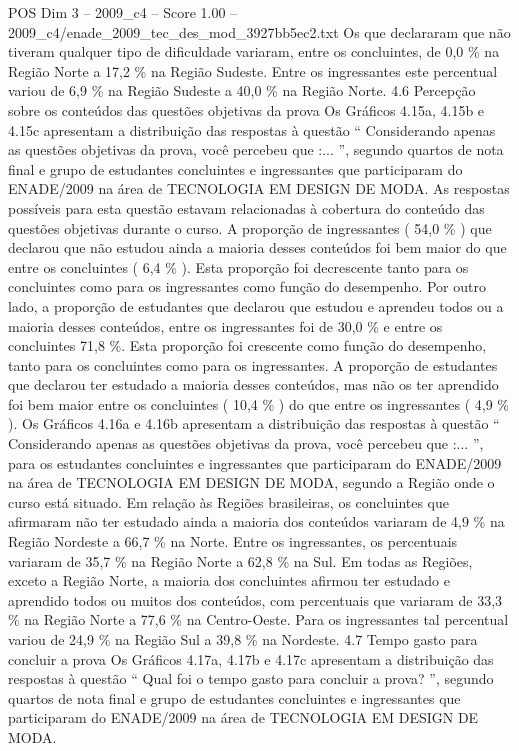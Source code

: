 \begin{textsample}{POS Dim 3 – 2009\_c4 – Score 1.00 – 2009\_c4/enade\_2009\_tec\_des\_mod\_3927bb5ec2.txt}
Os que declararam que não tiveram qualquer tipo de dificuldade variaram, entre os concluintes, de 0,0 \% na Região Norte a 17,2 \% na Região Sudeste.
Entre os ingressantes este percentual variou de 6,9 \% na Região Sudeste a 40,0 \% na Região Norte. 4.6 Percepção sobre os conteúdos das questões objetivas da prova Os Gráficos 4.15a, 4.15b e 4.15c apresentam a distribuição das respostas à questão “ Considerando apenas as questões objetivas da prova, você percebeu que :... ”, segundo quartos de nota final e grupo de estudantes concluintes e ingressantes que participaram do ENADE/2009 na área de TECNOLOGIA EM DESIGN DE MODA.
As respostas possíveis para esta questão estavam relacionadas à cobertura do conteúdo das questões objetivas durante o curso.
A proporção de ingressantes ( 54,0 \% ) que declarou que não estudou ainda a maioria desses conteúdos foi bem maior do que entre os concluintes ( 6,4 \% ).
Esta proporção foi decrescente tanto para os concluintes como para os ingressantes como função do desempenho.
Por outro lado, a proporção de estudantes que declarou que estudou e aprendeu todos ou a maioria desses conteúdos, entre os ingressantes foi de 30,0 \% e entre os concluintes 71,8 \%.
Esta proporção foi crescente como função do desempenho, tanto para os concluintes como para os ingressantes.
A proporção de estudantes que declarou ter estudado a maioria desses conteúdos, mas não os ter aprendido foi bem maior entre os concluintes ( 10,4 \% ) do que entre os ingressantes ( 4,9 \% ).
Os Gráficos 4.16a e 4.16b apresentam a distribuição das respostas à questão “ Considerando apenas as questões objetivas da prova, você percebeu que :... ”, para os estudantes concluintes e ingressantes que participaram do ENADE/2009 na área de TECNOLOGIA EM DESIGN DE MODA, segundo a Região onde o curso está situado.
Em relação às Regiões brasileiras, os concluintes que afirmaram não ter estudado ainda a maioria dos conteúdos variaram de 4,9 \% na Região Nordeste a 66,7 \% na Norte.
Entre os ingressantes, os percentuais variaram de 35,7 \% na Região Norte a 62,8 \% na Sul.
Em todas as Regiões, exceto a Região Norte, a maioria dos concluintes afirmou ter estudado e aprendido todos ou muitos dos conteúdos, com percentuais que variaram de 33,3 \% na Região Norte a 77,6 \% na Centro-Oeste.
Para os ingressantes tal percentual variou de 24,9 \% na Região Sul a 39,8 \% na Nordeste. 4.7 Tempo gasto para concluir a prova Os Gráficos 4.17a, 4.17b e 4.17c apresentam a distribuição das respostas à questão “ Qual foi o tempo gasto para concluir a prova? ”, segundo quartos de nota final e grupo de estudantes concluintes e ingressantes que participaram do ENADE/2009 na área de TECNOLOGIA EM DESIGN DE MODA.

\end{textsample}
